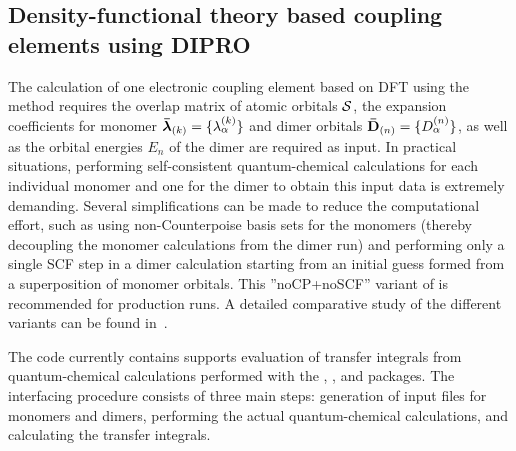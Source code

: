 \subsection{Density-functional theory based coupling elements using DIPRO}
\label{sec:dft}

The calculation of one electronic coupling element based on DFT using the \dipro method requires the overlap matrix of atomic orbitals $\mathbf{ \mathcal{S} }$, the expansion coefficients for monomer $\mathbf{ \bar{\boldsymbol{\lambda}} }_{(k)} = \{ \lambda_\alpha^{(k)}\}$ and dimer orbitals $\mathbf{ \bar{D} }_{(n)} = \{ D^{(n)}_{\alpha} \}$, as well as the orbital energies $E_{n}$ of the dimer are required as input. In practical situations, performing self-consistent quantum-chemical calculations for each individual monomer and one for the dimer to obtain this input data is extremely demanding. Several simplifications can be made to reduce the computational effort, such as using non-Counterpoise basis sets for the monomers (thereby decoupling the monomer calculations from the dimer run) and performing only a single SCF step in a dimer calculation starting from an initial guess formed from a superposition of monomer orbitals. This ''noCP+noSCF'' variant of \dipro is recommended for production runs. A detailed comparative study of the different variants can be found in~\cite{baumeier_density-functional_2010}.

The code currently contains supports evaluation of transfer integrals from quantum-chemical calculations performed with the \gaussian, \turbomole, and \nwchem packages. The interfacing procedure consists of three main steps: generation of input files for monomers and dimers, performing the actual quantum-chemical calculations, and calculating the transfer integrals. 

